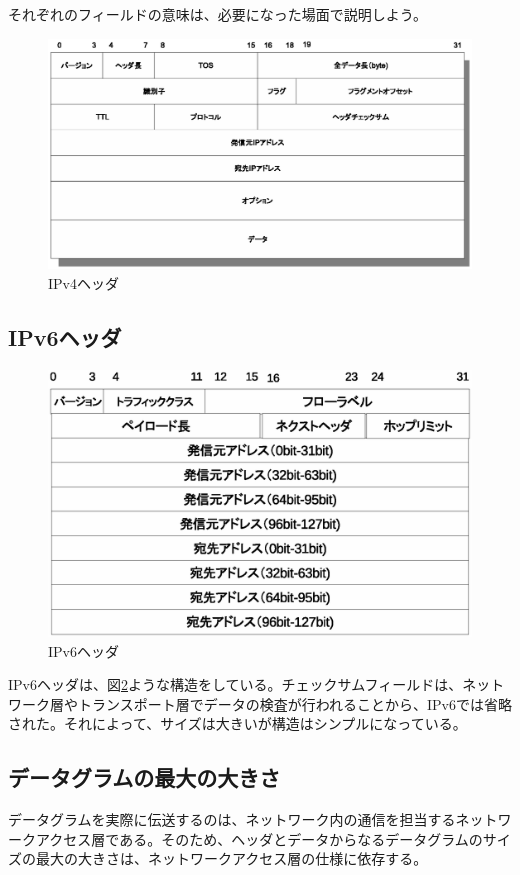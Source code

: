 それぞれのフィールドの意味は、必要になった場面で説明しよう。
\begin{figure}
	\includegraphics[width=14cm,clip]{draw/ipheader.eps}
	\caption{IPv4ヘッダ}
	\label{fig:ipheader}
\end{figure}

\subsection{IPv6ヘッダ}

\begin{figure}
	\includegraphics[width=14cm,clip]{draw/ipv6header.eps}
	\caption{IPv6ヘッダ}
	\label{fig:ipv6header}
\end{figure}

IPv6ヘッダは、図\ref{fig:ipv6header}ような構造をしている。チェックサムフィールドは、ネットワーク層やトランスポート層でデータの検査が行われることから、IPv6では省略された。それによって、サイズは大きいが構造はシンプルになっている。


\subsection{データグラムの最大の大きさ}
データグラムを実際に伝送するのは、ネットワーク内の通信を担当するネットワークアクセス層である。そのため、ヘッダとデータからなるデータグラムのサイズの最大の大きさは、ネットワークアクセス層の仕様に依存する。

